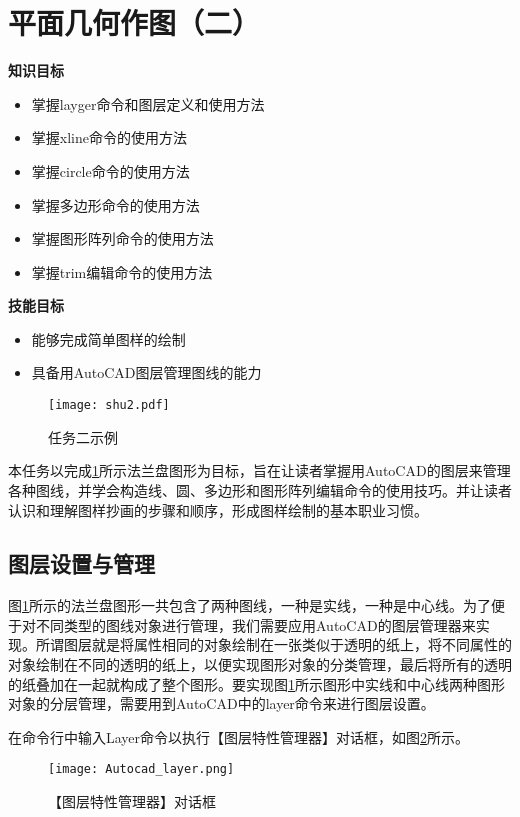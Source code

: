 \section{平面几何作图（二）}\label{sec:falan}

{\bfseries 知识目标}
\begin{itemize}
\item 掌握layger命令和图层定义和使用方法
\item 掌握xline命令的使用方法
\item 掌握circle命令的使用方法
\item 掌握多边形命令的使用方法
\item 掌握图形阵列命令的使用方法
\item 掌握trim编辑命令的使用方法
\end{itemize}

{\bfseries 技能目标}
\begin{itemize}
\item 能够完成简单图样的绘制
\item 具备用AutoCAD图层管理图线的能力
\end{itemize}

\noindent
\begin{figure}[htbp]
\centering
\texttt{[image: shu2.pdf]}
\caption{任务二示例}\label{fig:renwu2}
\end{figure}

\indent
本任务以完成\ref{fig:renwu2}所示法兰盘图形为目标，旨在让读者掌握用AutoCAD的图层来管理各种图线，并学会构造线、圆、多边形和图形阵列编辑命令的使用技巧。并让读者认识和理解图样抄画的步骤和顺序，形成图样绘制的基本职业习惯。

\subsection{图层设置与管理}
图\ref{fig:renwu2}所示的法兰盘图形一共包含了两种图线，一种是实线，一种是中心线。为了便于对不同类型的图线对象进行管理，我们需要应用AutoCAD的图层管理器来实现。所谓图层就是将属性相同的对象绘制在一张类似于透明的纸上，将不同属性的对象绘制在不同的透明的纸上，以便实现图形对象的分类管理，最后将所有的透明的纸叠加在一起就构成了整个图形。要实现图\ref{fig:renwu2}所示图形中实线和中心线两种图形对象的分层管理，需要用到AutoCAD中的layer命令来进行图层设置。

在命令行中输入Layer命令以执行【图层特性管理器】对话框，如图\ref{fig:tuchenguanliqi}所示。

\begin{figure}[htbp]
\centering
\texttt{[image: Autocad\_layer.png]}
\caption{【图层特性管理器】对话框}\label{fig:tuchenguanliqi}
\end{figure}


